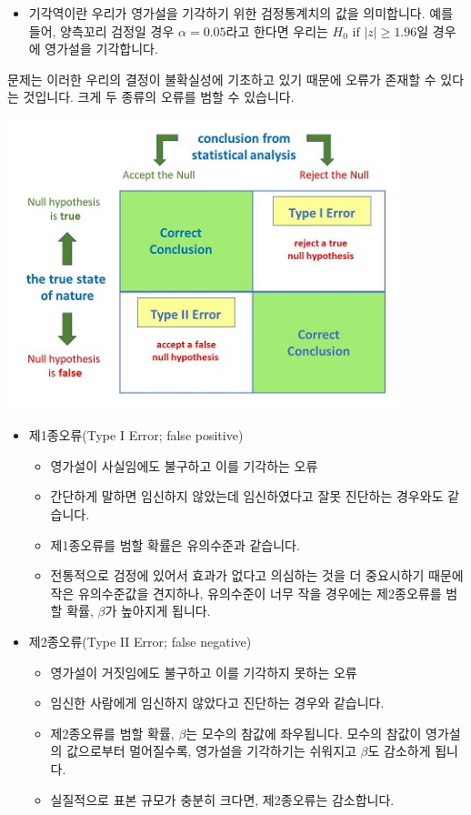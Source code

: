\documentclass[]{book}
\providecommand{\tightlist}{%
  \setlength{\itemsep}{0pt}\setlength{\parskip}{0pt}}
\begin{document}
\begin{itemize}
\tightlist
\item
  기각역이란 우리가 영가설을 기각하기 위한 검정통계치의 값을 의미합니다. 예를 들어, 양측꼬리 검정일 경우 \(\alpha=0.05\)라고 한다면 우리는 \(H_0 \text{ if } |z| \geq 1.96\)일 경우에 영가설을 기각합니다.
\end{itemize}

문제는 이러한 우리의 결정이 불확실성에 기초하고 있기 때문에 오류가 존재할 수 있다는 것입니다. 크게 두 종류의 오류를 범할 수 있습니다.

\begin{center}\includegraphics[width=4.51in]{./Chapters_pdfR/plot/typeoferrors} \end{center}

\begin{itemize}
\tightlist
\item
  제1종오류(Type I Error; false positive)

  \begin{itemize}
  \tightlist
  \item
    영가설이 사실임에도 불구하고 이를 기각하는 오류
  \item
    간단하게 말하면 임신하지 않았는데 임신하였다고 잘못 진단하는 경우와도 같습니다.
  \item
    제1종오류를 범할 확률은 유의수준과 같습니다.
  \item
    전통적으로 검정에 있어서 효과가 없다고 의심하는 것을 더 중요시하기 때문에 작은 유의수준값을 견지하나, 유의수준이 너무 작을 경우에는 제2종오류를 범할 확률, \(\beta\)가 높아지게 됩니다.
  \end{itemize}
\item
  제2종오류(Type II Error; false negative)

  \begin{itemize}
  \tightlist
  \item
    영가설이 거짓임에도 불구하고 이를 기각하지 못하는 오류
  \item
    임신한 사람에게 임신하지 않았다고 진단하는 경우와 같습니다.
  \item
    제2종오류를 범할 확률, \(\beta\)는 모수의 참값에 좌우됩니다. 모수의 참값이 영가설의 값으로부터 멀어질수록, 영가설을 기각하기는 쉬워지고 \(\beta\)도 감소하게 됩니다.
  \item
    실질적으로 표본 규모가 충분히 크다면, 제2종오류는 감소합니다.
  \end{itemize}
\end{itemize}
\end{document}
